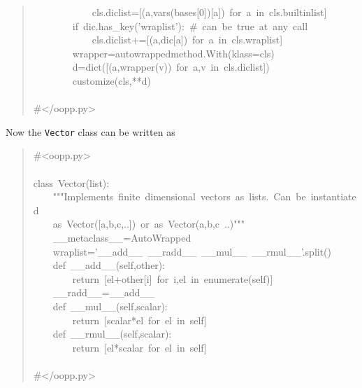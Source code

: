 \documentclass[10pt,english]{article}
\begin{document}
\begin{quote}
\begin{ttfamily}
\begin{flushleft}
\mbox{~~~~~~~~~~~~cls.diclist=[(a,vars(bases[0])[a])~for~a~in~cls.builtinlist]}\\
\mbox{~~~~~~~~if~dic.has{\_}key('wraplist'):~{\#}~can~be~true~at~any~call}\\
\mbox{~~~~~~~~~~~~cls.diclist+=[(a,dic[a])~for~a~in~cls.wraplist]~}\\
\mbox{~~~~~~~~wrapper=autowrappedmethod.With(klass=cls)}\\
\mbox{~~~~~~~~d=dict([(a,wrapper(v))~for~a,v~in~cls.diclist])}\\
\mbox{~~~~~~~~customize(cls,**d)}\\
\mbox{~~~~}\\
\mbox{{\#}</oopp.py>}
\end{flushleft}\end{ttfamily}
\end{quote}

Now the \texttt{Vector} class can be written as
\begin{quote}
\begin{ttfamily}\begin{flushleft}
\mbox{{\#}<oopp.py>}\\
\mbox{}\\
\mbox{class~Vector(list):}\\
\mbox{~~~~"""Implements~finite~dimensional~vectors~as~lists.~Can~be~instantiated}\\
\mbox{~~~~as~Vector([a,b,c,..])~or~as~Vector(a,b,c~..)"""}\\
\mbox{~~~~{\_}{\_}metaclass{\_}{\_}=AutoWrapped}\\
\mbox{~~~~wraplist='{\_}{\_}add{\_}{\_}~{\_}{\_}radd{\_}{\_}~{\_}{\_}mul{\_}{\_}~{\_}{\_}rmul{\_}{\_}'.split()}\\
\mbox{~~~~def~{\_}{\_}add{\_}{\_}(self,other):}\\
\mbox{~~~~~~~~return~[el+other[i]~for~i,el~in~enumerate(self)]}\\
\mbox{~~~~{\_}{\_}radd{\_}{\_}={\_}{\_}add{\_}{\_}}\\
\mbox{~~~~def~{\_}{\_}mul{\_}{\_}(self,scalar):}\\
\mbox{~~~~~~~~return~[scalar*el~for~el~in~self]}\\
\mbox{~~~~def~{\_}{\_}rmul{\_}{\_}(self,scalar):}\\
\mbox{~~~~~~~~return~[el*scalar~for~el~in~self]}\\
\mbox{}\\
\mbox{{\#}</oopp.py>}
\end{flushleft}\end{ttfamily}
\end{quote}
\end{document}
